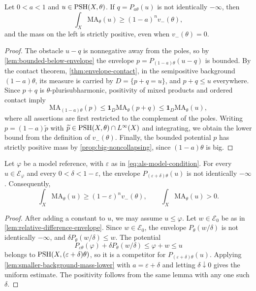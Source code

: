 \begin{lemma}\label{lem:smaller-background-mass-lower}
Let $0<a<1$ and $u\in\mathrm{PSH}(X,\theta)$. If $q=P_{a\theta}(u)$ is not identically $-\infty$, then
\[
 \int_X\mathrm{MA}_\theta(u)\geq(1-a)^n v_-(\theta),
\]
and the mass on the left is strictly positive, even when $v_-(\theta)=0$.
\end{lemma}
\begin{proof}
The obstacle $u-q$ is nonnegative away from the poles, so by \cref{lem:bounded-below-envelope} the envelope
$p=P_{(1-a)\theta}(u-q)$ is bounded. By the contact theorem, \cref{thm:envelope-contact}, in the semipositive background $(1-a)\theta$, its measure is carried by $D=\{p+q=u\}$, and $p+q\leq u$ everywhere. Since $p+q$ is $\theta$-plurisubharmonic, positivity of mixed products and ordered contact imply
\[
 \mathrm{MA}_{(1-a)\theta}(p)
 \leq\mathbf1_D\mathrm{MA}_\theta(p+q)
 \leq\mathbf1_D\mathrm{MA}_\theta(u),
\]
where all assertions are first restricted to the complement of the poles. Writing $p=(1-a)\widetilde p$ with $\widetilde p\in\mathrm{PSH}(X,\theta)\cap L^\infty(X)$ and integrating, we obtain the lower bound from the definition of $v_-(\theta)$. Finally, the bounded potential $p$ has strictly positive mass by \cref{prop:big-noncollapsing}, since $(1-a)\theta$ is big.
\end{proof}

\begin{theorem}\label{thm:relative-uniform-mass-lower}
Let $\varphi$ be a model reference, with $\varepsilon$ as in \eqref{eq:als-model-condition}. For every $u\in\mathcal E_\varphi$ and every $0<\delta<1-\varepsilon$, the envelope $P_{(\varepsilon+\delta)\theta}(u)$ is not identically $-\infty$. Consequently,
\[
 \int_X\mathrm{MA}_\theta(u)\geq(1-\varepsilon)^n v_-(\theta),
 \qquad \int_X\mathrm{MA}_\theta(u)>0.
\]
\end{theorem}
\begin{proof}
After adding a constant to $u$, we may assume $u\leq\varphi$. Let $w\in\mathcal E_0$ be as in \cref{lem:relative-difference-envelope}. Since $w\in\mathcal E_0$, the envelope $P_\theta(w/\delta)$ is not identically $-\infty$, and $\delta P_\theta(w/\delta)\leq w$. The potential
\[
 P_{\varepsilon\theta}(\varphi)+\delta P_\theta(w/\delta)
 \leq\varphi+w\leq u
\]
belongs to $\mathrm{PSH}(X,(\varepsilon+\delta)\theta)$, so it is a competitor for $P_{(\varepsilon+\delta)\theta}(u)$. Applying \cref{lem:smaller-background-mass-lower} with $a=\varepsilon+\delta$ and letting $\delta\downarrow0$ gives the uniform estimate. The positivity follows from the same lemma with any one such $\delta$.
\end{proof}

